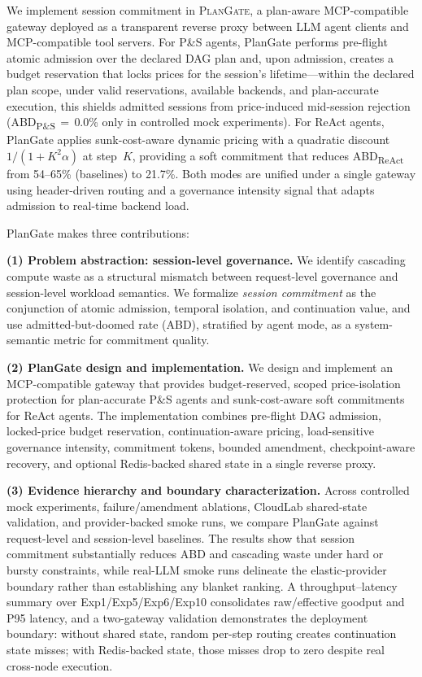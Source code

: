 \documentclass[sigconf,review,anonymous]{acmart}
\begin{document}
We implement session commitment in \textsc{PlanGate}, a plan-aware MCP-compatible gateway deployed as a transparent reverse proxy between LLM agent clients and MCP-compatible tool servers. For P\&S agents, PlanGate performs pre-flight atomic admission over the declared DAG plan and, upon admission, creates a budget reservation that locks prices for the session's lifetime---within the declared plan scope, under valid reservations, available backends, and plan-accurate execution, this shields admitted sessions from price-induced mid-session rejection (ABD\textsubscript{P\&S}$\,{=}\,$0.0\% only in controlled mock experiments). For ReAct agents, PlanGate applies sunk-cost-aware dynamic pricing with a quadratic discount $1/(1{+}K^2\alpha)$ at step~$K$, providing a soft commitment that reduces ABD\textsubscript{ReAct} from 54--65\% (baselines) to 21.7\%. Both modes are unified under a single gateway using header-driven routing and a governance intensity signal that adapts admission to real-time backend load.

PlanGate makes three contributions:

\noindent\textbf{(1) Problem abstraction: session-level governance.} We identify cascading compute waste as a structural mismatch between request-level governance and session-level workload semantics. We formalize \emph{session commitment} as the conjunction of atomic admission, temporal isolation, and continuation value, and use admitted-but-doomed rate (ABD), stratified by agent mode, as a system-semantic metric for commitment quality.

\noindent\textbf{(2) PlanGate design and implementation.} We design and implement an MCP-compatible gateway that provides budget-reserved, scoped price-isolation protection for plan-accurate P\&S agents and sunk-cost-aware soft commitments for ReAct agents. The implementation combines pre-flight DAG admission, locked-price budget reservation, continuation-aware pricing, load-sensitive governance intensity, commitment tokens, bounded amendment, checkpoint-aware recovery, and optional Redis-backed shared state in a single reverse proxy.

\noindent\textbf{(3) Evidence hierarchy and boundary characterization.} Across controlled mock experiments, failure/amendment ablations, CloudLab shared-state validation, and provider-backed smoke runs, we compare PlanGate against request-level and session-level baselines. The results show that session commitment substantially reduces ABD and cascading waste under hard or bursty constraints, while real-LLM smoke runs delineate the elastic-provider boundary rather than establishing any blanket ranking. A throughput--latency summary over Exp1/Exp5/Exp6/Exp10 consolidates raw/effective goodput and P95 latency, and a two-gateway validation demonstrates the deployment boundary: without shared state, random per-step routing creates continuation state misses; with Redis-backed state, those misses drop to zero despite real cross-node execution.
\end{document}
